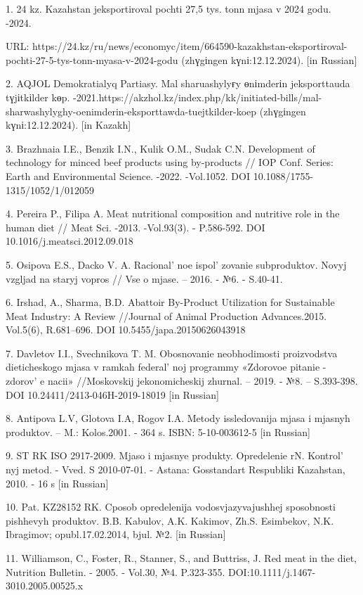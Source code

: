 \begin{references}
1. 24 kz. Kazahstan jeksportiroval pochti 27,5 tys. tonn mjasa v 2024
godu. -2024.

URL:
https://24.kz/ru/news/economyc/item/664590-kazakhstan-eksportiroval-pochti-27-5-tys-tonn-myasa-v-2024-godu
(zhүgіngen kүnі:12.12.2024). {[}in Russian{]}

2. AQJOL Demokratialyq Partiasy. Mal sharuashylyғy өnіmderіn
jeksporttauda tүjіtkіlder kөp.
-2021.https://akzhol.kz/index.php/kk/initiated-bills/mal-sharwashylyghy-oenimderin-eksporttawda-tuejtkilder-koep
(zhүgіngen kүnі:12.12.2024). {[}in Kazakh{]}

3. Brazhnaia I.E., Benzik I.N., Kulik O.M., Sudak C.N. Development of
technology for minced beef products using by-products // IOP Conf.
Series: Earth and Environmental Science. -2022. -Vol.1052. DOI
10.1088/1755-1315/1052/1/012059

4. Pereira P., Filipa A. Meat nutritional composition and nutritive role
in the human diet // Meat Sci. -2013. -Vol.93(3). - P.586-592. DOI
10.1016/j.meatsci.2012.09.018

5. Osipova E.S., Dacko V. A. Racional' noe
ispol' zovanie subproduktov. Novyj vzgljad na staryj
vopros // Vse o mjase. -- 2016. - №6. - S.40-41.

6. Irshad, A., Sharma, B.D. Abattoir By-Product Utilization for
Sustainable Meat Industry: A Review //Journal of Animal Production
Advances.2015. Vol.5(6), R.681--696. DOI 10.5455/japa.20150626043918

7. Davletov I.I., Svechnikova T. M. Obosnovanie neobhodimosti
proizvodstva dieticheskogo mjasa v ramkah federal' noj
programmy «Zdorovoe pitanie - zdorov' e nacii»
//Moskovskij jekonomicheskij zhurnal. -- 2019. - №8. -- S.393-398. DOI
10.24411/2413-046H-2019-18019 {[}in Russian{]}

8. Antipova L.V, Glotova I.A, Rogov I.A. Metody issledovanija mjasa i
mjasnyh produktov. -- M.: Kolos.2001. - 364 s. ISBN: 5-10-003612-5
{[}in Russian{]}

9. ST RK ISO 2917-2009. Mjaso i mjasnye produkty. Opredelenie rN.
Kontrol' nyj metod. - Vved. S 2010-07-01. - Astana:
Gosstandart Respubliki Kazahstan, 2010. - 16 s {[}in Russian{]}

10. Pat. KZ28152 RK. Cposob opredelenija vodosvjazyvajushhej sposobnosti
pishhevyh produktov. B.B. Kabulov, A.K. Kakimov, Zh.S. Esimbekov, N.K.
Ibragimov; opubl.17.02.2014, bjul. №2. {[}in Russian{]}

11. Williamson, C., Foster, R., Stanner, S., and Buttriss, J. Red meat
in the diet, Nutrition Bulletin. - 2005. - Vol.30, №4. P.323-355.
DOI:10.1111/j.1467-3010.2005.00525.x


\end{references}
